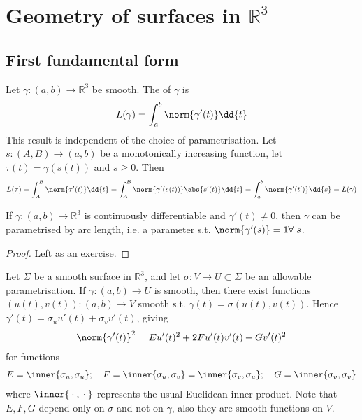 \section{Geometry of surfaces in $\mathbb R^3$}

\subsection{First fundamental form}
Let $\gamma \colon (a,b) \to \mathbb R^3$ be smooth.
The  of $\gamma$ is
\begin{align*}
	L(\gamma) = \int_a^b \norm{\gamma'(t)} \dd{t}
\end{align*}
This result is independent of the choice of parametrisation.
Let $s \colon (A,B) \to (a,b)$ be a monotonically increasing function, let $\tau(t) = \gamma(s(t))$ and $s \geq 0$.
Then
\begin{align*}
	L(\tau) = \int_A^B \norm{\tau'(t)} \dd{t} = \int_A^B \norm{\gamma'(s(t))} \abs{s'(t)} \dd{t} = \int_a^b \norm{\gamma'(t')} \dd{s} = L(\gamma)
\end{align*}

\begin{lemma}
	If $\gamma \colon (a,b) \to \mathbb R^3$ is continuously differentiable and $\gamma'(t) \neq 0$, then $\gamma$ can be parametrised by arc length, i.e. a parameter s.t. $\norm{\gamma'(s)} = 1 \forall \; s$.
\end{lemma}

\begin{proof}
	Left as an exercise.
\end{proof} 

Let $\Sigma$ be a smooth surface in $\mathbb R^3$, and let $\sigma \colon V \to U \subset \Sigma$ be an allowable parametrisation.
If $\gamma \colon (a,b) \to U$ is smooth, then there exist functions $(u(t), v(t)) \colon (a,b) \to V$ smooth s.t. $\gamma(t) = \sigma(u(t), v(t))$.
Hence $\gamma'(t) = \sigma_u u'(t) + \sigma_v v'(t)$, giving
\begin{align*}
	\norm{\gamma'(t)}^2 = E u'(t)^2 + 2F u'(t) v'(t) + G v'(t)^2
\end{align*}
for functions
\begin{align*}
	E = \inner{\sigma_u, \sigma_u};\quad F = \inner{\sigma_u, \sigma_v} = \inner{\sigma_v, \sigma_u};\quad G = \inner{\sigma_v, \sigma_v}
\end{align*}
where $\inner{\wildcard,\wildcard}$ represents the usual Euclidean inner product.
Note that $E, F, G$ depend only on $\sigma$ and not on $\gamma$, also they are smooth functions on $V$.

